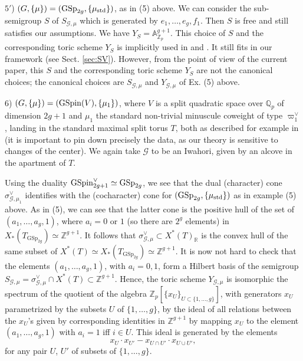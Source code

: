 \documentclass[reqno, 10pt]{amsart}
\newcommand{\BA}{\ensuremath{\mathbb {A}}\xspace}
\newcommand{\BQ}{\ensuremath{\mathbb {Q}}\xspace}
\newcommand{\BR}{\ensuremath{\mathbb {R}}\xspace}
\newcommand{\BZ}{\ensuremath{\mathbb {Z}}\xspace}
\newcommand{\CG}{\ensuremath{\mathcal {G}}\xspace}
\newcommand{\GSp}{\mathrm{GSp}}
\theoremstyle{definition}
\numberwithin{equation}{subsection}
\numberwithin{subsubsection}{subsection}
\begin{document}
$5'$) $(G,\{\mu\})=(\GSp_{2g}, \{\mu_{\rm std}\})$, as in (5) above. We can consider the sub-semigroup $S$ of $S_{\CG, \mu}$ which is generated by $e_1,\ldots , e_g, f_1$. Then $S$ is free and still satisfies our assumptions.
We have $Y_S=\BA^{g+1}_{\BZ_p}$. This choice of $S$ and the corresponding toric scheme $Y_S$ is implicitly used in \cite[\S 4.1, \S 4.2]{Shadrach} and \cite{Marazza}. It still fits in our framework   (see Sect. \ref{sec:SV}). However, from the point of view of the current paper, this $S$ and the corresponding toric scheme $Y_S$ are not the canonical choices; the canonical choices are  $S_{\CG,\mu}$ and $Y_{\CG,\mu}$ of Ex. (5) above.
\smallskip



6) $(G, \{\mu\})=({\rm GSpin}(V),\{\mu_1\})$, where $V$ is a split quadratic space over $\BQ_p$ of dimension $2g+1$ and $\mu_1$ the standard non-trivial minuscule coweight of type $\varpi^\vee_1$,
landing in the standard maximal split torus $T$, both as described for example in \cite[\S 4.2.1]{HP}  (it is important to pin down precisely the data, as our theory is sensitive to changes of the center). We again take $\CG$ to be an Iwahori, given by an alcove in the apartment of $T$. 

Using the duality ${\rm GSpin}^\vee_{2g+1}\simeq \GSp_{2g}$, we see that the dual  (character) cone $\sigma^\vee_{\CG,\mu_1}$ identifies with the (cocharacter) cone for
$(\GSp_{2g}, \{\mu_{\rm std}\})$ as in example (5) above. As in  (5), we can see that the latter cone is the positive hull of
the set of $(a_1,\ldots, a_g, 1)$, where $a_i=0$ or $1$ (so there are $2^g$ elements) in $X_*(T_{\GSp_{2g}})\simeq \BZ^{g+1}$. It follows that $\sigma^\vee_{\CG,\mu}\subset X^*(T)_\BR$
is the convex hull of the same subset of $X^*(T)\simeq X_*(T_{\GSp_{2g}})\simeq \BZ^{g+1}$. It is now not hard to check that the elements $(a_1,\ldots, a_g, 1)$, with $a_i=0, 1$, form a Hilbert basis
 of the semigroup  $S_{\CG,\mu}=\sigma^\vee_{\CG,\mu}\cap X^*(T)\subset \BZ^{g+1}$. Hence, the  toric scheme $Y_{\CG,\mu}$ is isomorphic the spectrum of the quotient 
of the algebra $\BZ_p[\{x_U\}_{U\subset \{1,\ldots ,g\}}]$, with generators $x_U$ parametrized by the subsets $U$ of $\{1,\ldots ,g\}$, by the ideal of all  relations between the $x_U$'s  
given by corresponding identities in $\BZ^{g+1}$ by mapping $x_U$ to the element  $(a_1,\ldots ,a_g, 1)$ with $a_i=1$ iff $i\in U$. This ideal is generated 
by the   elements 
\[
x_{U}\cdot x_{U'}-x_{U\cap U'}\cdot x_{U\cup U'},
\]
for any pair $U$, $U'$ of subsets of $\{1,\ldots ,g\}$. 
 
\end{document}
